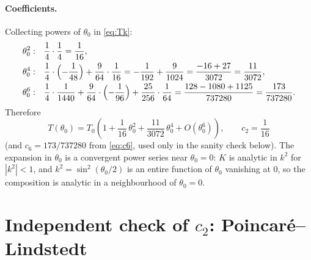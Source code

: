 \documentclass{article}
\begin{document}
\paragraph{Coefficients.}
Collecting powers of $\theta_0$ in \eqref{eq:Tk}:
\begin{align}
  \theta_0^2:&\quad \frac14\cdot\frac14 = \frac{1}{16}, \label{eq:c2}\\
  \theta_0^4:&\quad \frac14\cdot\Bigl(-\frac{1}{48}\Bigr)
     + \frac{9}{64}\cdot\frac{1}{16}
     = -\frac{1}{192} + \frac{9}{1024} = \frac{-16 + 27}{3072}
     = \frac{11}{3072}, \label{eq:c4}\\
  \theta_0^6:&\quad \frac14\cdot\frac{1}{1440}
     + \frac{9}{64}\cdot\Bigl(-\frac{1}{96}\Bigr)
     + \frac{25}{256}\cdot\frac{1}{64}
     = \frac{128 - 1080 + 1125}{737280} = \frac{173}{737280}. \label{eq:c6}
\end{align}
Therefore
\begin{equation}
  \boxed{\;
  T(\theta_0) = T_0\left(1 + \frac{1}{16}\,\theta_0^2
    + \frac{11}{3072}\,\theta_0^4 + O(\theta_0^6)\right),
  \qquad c_2 = \frac{1}{16}
  \;}
  \label{eq:result}
\end{equation}
(and $c_6 = 173/737280$ from \eqref{eq:c6}, used only in the sanity check
below). The expansion in $\theta_0$ is a convergent power series near
$\theta_0 = 0$: $K$ is analytic in $k^2$ for $|k^2|<1$, and
$k^2 = \sin^2(\theta_0/2)$ is an entire function of $\theta_0$ vanishing at
$0$, so the composition is analytic in a neighbourhood of $\theta_0 = 0$.

\section{Independent check of $c_2$: Poincar\'e--Lindstedt}
\end{document}
